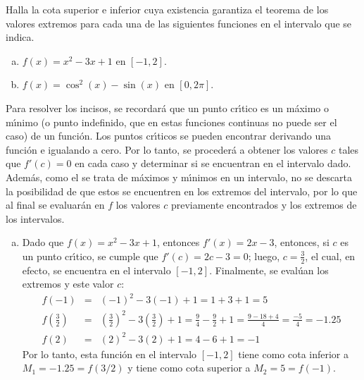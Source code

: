 \begin{enunciado}
 Halla la cota superior e inferior cuya existencia garantiza el teorema de los valores extremos para cada una de las siguientes funciones en el intervalo que se indica.
 \begin{enumerate}[(a)]
  \item $f(x) = x^2 - 3x + 1$ en $[-1, 2]$.
  \item $f(x) = \cos^2(x) - \sin(x)$ en $[0,2\pi]$.
 \end{enumerate}
\end{enunciado}

\begin{solucion}
 Para resolver los incisos, se recordar\'a que un punto cr\'{\i}tico es un m\'aximo o m\'{\i}nimo (o punto indefinido, que en estas funciones continuas no puede ser el caso) de un funci\'on. Los puntos cr\'{\i}ticos se pueden encontrar derivando una funci\'on e igualando a cero. Por lo tanto, se proceder\'a a obtener los valores $c$ tales que $f'(c) = 0$ en cada caso y determinar si se encuentran en el intervalo dado. Adem\'as, como el se trata de m\'aximos y m\'{\i}nimos en un intervalo, no se descarta la posibilidad de que estos se encuentren en los extremos del intervalo, por lo que al final se evaluar\'an en $f$ los valores $c$ previamente encontrados y los extremos de los intervalos.
 \begin{enumerate}[(a)]
  \item Dado que $f(x) = x^2 - 3x +1$, entonces $f'(x) = 2x - 3$, entonces, si $c$ es un punto cr\'{\i}tico, se cumple que $f'(c) = 2c - 3 = 0$; luego, $c = \frac{3}{2}$, el cual, en efecto, se encuentra en el intervalo $[-1,2]$. Finalmente, se eval\'uan los extremos y este valor $c$:
  \begin{eqnarray*}
   f(-1) & = & (-1)^2 - 3(-1) + 1 = 1 + 3 + 1 = 5 \\
   f\left( \frac{3}{2} \right) & = & \left( \frac{3}{2} \right)^2 - 3\left( \frac{3}{2} \right) + 1 = \frac{9}{4} - \frac{9}{2} + 1 = \frac{9-18+4}{4} = \frac{-5}{4} = -1.25 \\
   f(2) & = & (2)^2 - 3(2) + 1 = 4 - 6 + 1 = -1
  \end{eqnarray*}
  Por lo tanto, esta funci\'on en el intervalo $[-1,2]$ tiene como cota inferior a $M_1 = -1.25 = f(3/2)$ y tiene como cota superior a $M_2 = 5 = f(-1)$.
  

\end{enumerate}
\end{solucion}
